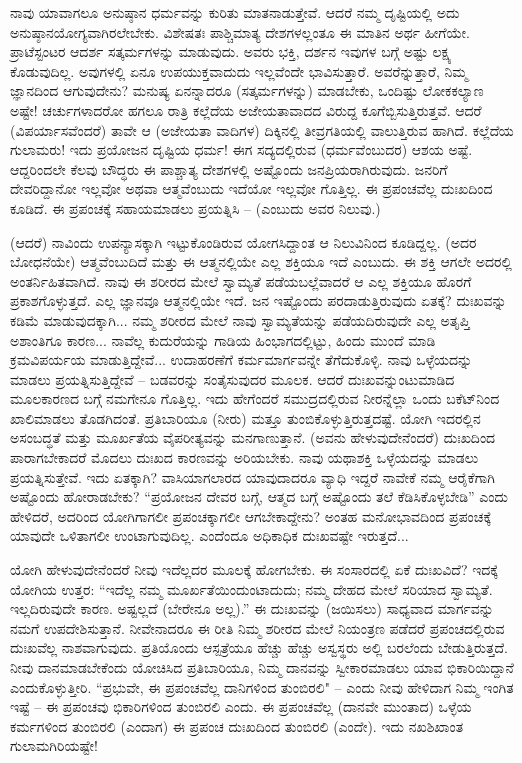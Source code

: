 ನಾವು ಯಾವಾಗಲೂ ಅನುಷ್ಠಾನ ಧರ್ಮವನ್ನು ಕುರಿತು ಮಾತನಾಡುತ್ತೇವೆ. ಆದರೆ ನಮ್ಮ ದೃಷ್ಟಿಯಲ್ಲಿ ಅದು ಅನುಷ್ಠಾನಯೋಗ್ಯವಾಗಿರಲೇಬೇಕು. ವಿಶೇಷತಃ ಪಾಶ್ಚಿಮಾತ್ಯ ದೇಶಗಳಲ್ಲಂತೂ ಈ ಮಾತಿನ ಅರ್ಥ ಹೀಗೆಯೇ. ಪ್ರಾಟೆಸ್ಟಂಟರ ಆದರ್ಶ ಸತ್ಕರ್ಮಗಳನ್ನು ಮಾಡುವುದು. ಅವರು ಭಕ್ತಿ, ದರ್ಶನ ಇವುಗಳ ಬಗ್ಗೆ ಅಷ್ಟು ಲಕ್ಷ್ಯ ಕೊಡುವುದಿಲ್ಲ. ಅವುಗಳಲ್ಲಿ ಏನೂ ಉಪಯುಕ್ತವಾದುದು ಇಲ್ಲವೆಂದೇ ಭಾವಿಸುತ್ತಾರೆ. ಅವರೆನ್ನುತ್ತಾರೆ, ನಿಮ್ಮ ಜ್ಞಾನದಿಂದ ಆಗುವುದೇನು? ಮನುಷ್ಯ ಏನನ್ನಾದರೂ (ಸತ್ಕರ್ಮಗಳನ್ನು) ಮಾಡಬೇಕು, ಒಂದಿಷ್ಟು ಲೋಕಕಲ್ಯಾಣ ಅಷ್ಟೇ! ಚರ್ಚುಗಳಾದರೋ ಹಗಲೂ ರಾತ್ರಿ ಕಲ್ಲೆದೆಯ ಅಜೇಯತಾವಾದದ ವಿರುದ್ದ ಕೂಗೆಬ್ಬಿಸುತ್ತಿರುತ್ತವೆ. ಆದರೆ \break (ವಿಪರ್ಯಾಸವೆಂದರೆ) ತಾವೇ ಆ (ಅಜೇಯತಾ ವಾದಿಗಳ) ದಿಕ್ಕಿನಲ್ಲಿ ತೀವ್ರಗತಿಯಲ್ಲಿ ವಾಲುತ್ತಿರುವ ಹಾಗಿದೆ. ಕಲ್ಲೆದೆಯ ಗುಲಾಮರು! ಇದು ಪ್ರಯೋಜನ ದೃಷ್ಟಿಯ ಧರ್ಮ! ಈಗ ಸದ್ಯದಲ್ಲಿರುವ (ಧರ್ಮವೆಂಬುದರ) ಆಶಯ ಅಷ್ಟೆ. ಆದ್ದರಿಂದಲೇ ಕೆಲವು ಬೌದ್ಧರು ಈ ಪಾಶ್ಚಾತ್ಯ ದೇಶಗಳಲ್ಲಿ ಅಷ್ಟೊಂದು ಜನಪ್ರಿಯರಾಗಿರುವುದು. ಜನರಿಗೆ ದೇವರಿದ್ದಾನೋ ಇಲ್ಲವೋ ಅಥವಾ ಆತ್ಮವೆಂಬುದು ಇದೆಯೋ ಇಲ್ಲವೋ ಗೊತ್ತಿಲ್ಲ. ಈ ಪ್ರಪಂಚವೆಲ್ಲ ದುಃಖದಿಂದ ಕೂಡಿದೆ. ಈ ಪ್ರಪಂಚಕ್ಕೆ ಸಹಾಯಮಾಡಲು ಪ್ರಯತ್ನಿಸಿ – (ಎಂಬುದು ಅವರ ನಿಲುವು.)

(ಆದರೆ) ನಾವಿಂದು ಉಪನ್ಯಾಸಕ್ಕಾಗಿ ಇಟ್ಟುಕೊಂಡಿರುವ ಯೋಗಸಿದ್ದಾಂತ ಆ ನಿಲುವಿನಿಂದ ಕೂಡಿದ್ದಲ್ಲ. (ಅದರ ಬೋಧನೆಯೇ) ಆತ್ಮವೆಂಬುದಿದೆ ಮತ್ತು ಈ ಆತ್ಮನಲ್ಲಿಯೇ ಎಲ್ಲ ಶಕ್ತಿಯೂ ಇದೆ ಎಂಬುದು. ಈ ಶಕ್ತಿ ಆಗಲೇ ಅದರಲ್ಲಿ ಅಂತರ್ನಿಹಿತವಾಗಿದೆ. ನಾವು ಈ ಶರೀರದ ಮೇಲೆ ಸ್ವಾಮ್ಯತೆ ಪಡೆಯಬಲ್ಲೆವಾದರೆ ಆ ಎಲ್ಲ ಶಕ್ತಿಯೂ ಹೊರಗೆ ಪ್ರಕಾಶಗೊಳ್ಳುತ್ತದೆ. ಎಲ್ಲ ಜ್ಞಾನವೂ ಆತ್ಮನಲ್ಲಿಯೇ ಇದೆ. ಜನ ಇಷ್ಟೊಂದು ಪರದಾಡುತ್ತಿರುವುದು ಏತಕ್ಕೆ? ದುಃಖವನ್ನು ಕಡಿಮೆ ಮಾಡುವುದಕ್ಕಾಗಿ... ನಮ್ಮ ಶರೀರದ ಮೇಲೆ ನಾವು ಸ್ವಾಮ್ಯತೆಯನ್ನು ಪಡೆಯದಿರುವುದೇ ಎಲ್ಲ ಅತೃಪ್ತಿ ಅಶಾಂತಿಗೂ ಕಾರಣ... ನಾವೆಲ್ಲ ಕುದುರೆಯನ್ನು ಗಾಡಿಯ ಹಿಂಭಾಗದಲ್ಲಿಟ್ಟು, ಹಿಂದು ಮುಂದೆ ಮಾಡಿ ಕ್ರಮವಿಪರ್ಯಯ ಮಾಡುತ್ತಿದ್ದೇವೆ... ಉದಾಹರಣೆಗೆ ಕರ್ಮಮಾರ್ಗವನ್ನೇ ತೆಗೆದುಕೊಳ್ಳಿ. ನಾವು ಒಳ್ಳೆಯದನ್ನು ಮಾಡಲು ಪ್ರಯತ್ನಿಸುತ್ತಿದ್ದೇವೆ – ಬಡವರನ್ನು ಸಂತೈಸುವುದರ ಮೂಲಕ. ಆದರೆ ದುಃಖವನ್ನುಂಟುಮಾಡಿದ ಮೂಲಕಾರಣದ ಬಗ್ಗೆ ನಮಗೇನೂ ಗೊತ್ತಿಲ್ಲ. ಇದು ಹೇಗೆಂದರೆ ಸಮುದ್ರದಲ್ಲಿರುವ ನೀರನ್ನೆಲ್ಲಾ ಒಂದು ಬಕೆಟ್‌ನಿಂದ ಖಾಲಿಮಾಡಲು ತೊಡಗಿದಂತೆ. ಪ್ರತಿಬಾರಿಯೂ (ನೀರು) ಮತ್ತೂ ತುಂಬಿಕೊಳ್ಳುತ್ತಿರುತ್ತದಷ್ಟೆ. ಯೋಗಿ ಇದರಲ್ಲಿನ ಅಸಂಬದ್ಧತೆ ಮತ್ತು ಮೂರ್ಖತೆಯ ವೈಪರೀತ್ಯವನ್ನು ಮನಗಾಣುತ್ತಾನೆ. (ಅವನು ಹೇಳುವುದೇನೆಂದರೆ) ದುಃಖದಿಂದ ಪಾರಾಗಬೇಕಾದರೆ ಮೊದಲು ದುಃಖದ ಕಾರಣವನ್ನು ಅರಿಯಬೇಕು. ನಾವು ಯಥಾಶಕ್ತಿ ಒಳ್ಳೆಯದನ್ನು ಮಾಡಲು ಪ್ರಯತ್ನಿಸುತ್ತೇವೆ. ಇದು ಏತಕ್ಕಾಗಿ? ವಾಸಿಯಾಗಲಾರದ ಯಾವುದಾದರೂ ವ್ಯಾಧಿ ಇದ್ದರೆ ನಾವೇಕೆ ನಮ್ಮ ಆರೈಕೆಗಾಗಿ ಅಷ್ಟೊಂದು ಹೋರಾಡಬೇಕು? “ಪ್ರಯೋಜನ ದೇವರ ಬಗ್ಗೆ, ಆತ್ಮದ ಬಗ್ಗೆ ಅಷ್ಟೊಂದು ತಲೆ ಕೆಡಿಸಿಕೊಳ್ಳಬೇಡಿ'' ಎಂದು ಹೇಳಿದರೆ, ಅದರಿಂದ ಯೋಗಿಗಾಗಲೀ ಪ್ರಪಂಚಕ್ಕಾಗಲೀ ಆಗಬೇಕಾದ್ದೇನು? ಅಂತಹ ಮನೋಭಾವದಿಂದ ಪ್ರಪಂಚಕ್ಕೆ ಯಾವುದೇ ಒಳಿತಾಗಲೀ ಉಂಟಾಗುವುದಿಲ್ಲ. ಎಂದೆಂದೂ ಅಧಿಕಾಧಿಕ ದುಃಖವಷ್ಟೇ ಇರುತ್ತದೆ...

ಯೋಗಿ ಹೇಳುವುದೇನೆಂದರೆ ನೀವು ಇದೆಲ್ಲದರ ಮೂಲಕ್ಕೆ ಹೋಗಬೇಕು. ಈ ಸಂಸಾರದಲ್ಲಿ ಏಕೆ ದುಃಖವಿದೆ? ಇದಕ್ಕೆ ಯೋಗಿಯ ಉತ್ತರ: “ಇದೆಲ್ಲ ನಮ್ಮ ಮೂರ್ಖತೆಯಿಂದುಂಟಾದುದು; ನಮ್ಮ ದೇಹದ ಮೇಲೆ ಸರಿಯಾದ ಸ್ವಾಮ್ಯತೆ. ಇಲ್ಲದಿರುವುದೇ ಕಾರಣ. ಅಷ್ಟಲ್ಲದೆ (ಬೇರೇನೂ ಅಲ್ಲ).” ಈ ದುಃಖವನ್ನು (ಜಯಿಸಲು) ಸಾಧ್ಯವಾದ ಮಾರ್ಗವನ್ನು ನಮಗೆ ಉಪದೇಶಿಸುತ್ತಾನೆ. ನೀವೇನಾದರೂ ಈ ರೀತಿ ನಿಮ್ಮ ಶರೀರದ ಮೇಲೆ ನಿಯಂತ್ರಣ ಪಡೆದರೆ ಪ್ರಪಂಚದಲ್ಲಿರುವ ದುಃಖವೆಲ್ಲ ನಾಶವಾಗುವುದು. ಪ್ರತಿಯೊಂದು ಆಸ್ಪತ್ರೆಯೂ ಹೆಚ್ಚು ಹೆಚ್ಚು ಅಸ್ವಸ್ಥರು ಅಲ್ಲಿ ಬರಲೆಂದು ಬೇಡುತ್ತಿರುತ್ತದೆ. ನೀವು ದಾನಮಾಡಬೇಕೆಂದು ಯೋಚಿಸಿದ ಪ್ರತಿಬಾರಿಯೂ, ನಿಮ್ಮ ದಾನವನ್ನು ಸ್ವೀಕಾರಮಾಡಲು ಯಾವ ಭಿಕಾರಿಯಿದ್ದಾನೆ ಎಂದುಕೊಳ್ಳುತ್ತೀರಿ. “ಪ್ರಭುವೇ, ಈ ಪ್ರಪಂಚವೆಲ್ಲ ದಾನಿಗಳಿಂದ ತುಂಬಿರಲಿ" – ಎಂದು ನೀವು ಹೇಳಿದಾಗ ನಿಮ್ಮ ಇಂಗಿತ ಇಷ್ಟೆ – ಈ ಪ್ರಪಂಚವು ಭಿಕಾರಿಗಳಿಂದ ತುಂಬಿರಲಿ ಎಂದು. ಈ ಪ್ರಪಂಚವೆಲ್ಲ (ದಾನವೇ ಮುಂತಾದ) ಒಳ್ಳೆಯ ಕರ್ಮಗಳಿಂದ ತುಂಬಿರಲಿ (ಎಂದಾಗ) ಈ ಪ್ರಪಂಚ ದುಃಖದಿಂದ ತುಂಬಿರಲಿ (ಎಂದೇ). ಇದು ನಖಶಿಖಾಂತ ಗುಲಾಮಗಿರಿಯಷ್ಟೇ!

